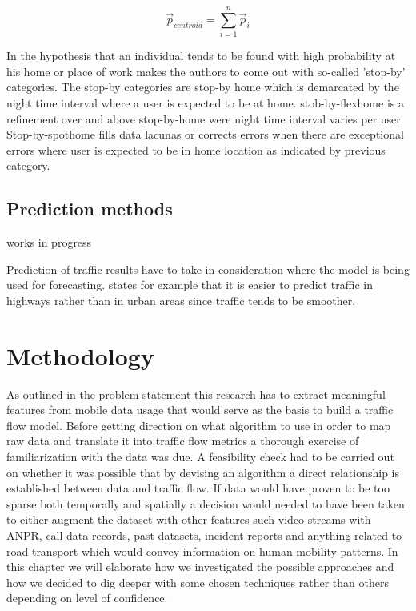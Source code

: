 \documentclass[12pt, a4paper]{report}
\theoremstyle{definition}
\theoremstyle{definition}%
\theoremstyle{definition}%
\theoremstyle{definition}%
\theoremstyle{definition}%
\theoremstyle{definition}%
\begin{document}
\begin{equation}
{\stackrel{\to }{p}}_{centroid} = \sum _{i=1}^{n}{\stackrel{\to }{p}}_{i}
\end{equation}

In \cite{Hoteit2016} the hypothesis that an individual tends to be found with high probability at his home or place of work makes the authors to come out with so-called 'stop-by' categories. The stop-by categories are stop-by home which is demarcated by the night time interval where a user is expected to be at home. stob-by-flexhome is a refinement over and above stop-by-home were night time interval varies per user. Stop-by-spothome fills data lacunas or corrects errors when there are exceptional errors where user is expected to be in home location as indicated by previous category.


\section{Prediction methods}

{works in progress}

Prediction of traffic results have to take in consideration where the model is being used for forecasting. \cite{Sommer2013} states for example that it is easier to predict traffic in highways rather than in urban areas since traffic tends to be smoother.





\chapter{Methodology}

As outlined in the problem statement this research has to extract meaningful features from mobile data usage that would serve as the basis to build a traffic flow model. Before getting direction on what algorithm to use in order to map raw data and translate it into traffic flow metrics a thorough exercise of familiarization with the data was due. A feasibility check had to be carried out on whether it was possible that by devising an algorithm a direct relationship is established between data and traffic flow. If data would have proven to be too sparse both temporally and spatially a decision would needed to have been taken to either augment the dataset with other features such video streams with ANPR, call data records, past datasets, incident reports and anything related to road transport which would convey information on human mobility patterns. In this chapter we will elaborate how we investigated the possible approaches and how we decided to dig deeper with some chosen techniques rather than others depending on level of confidence.
\end{document}
